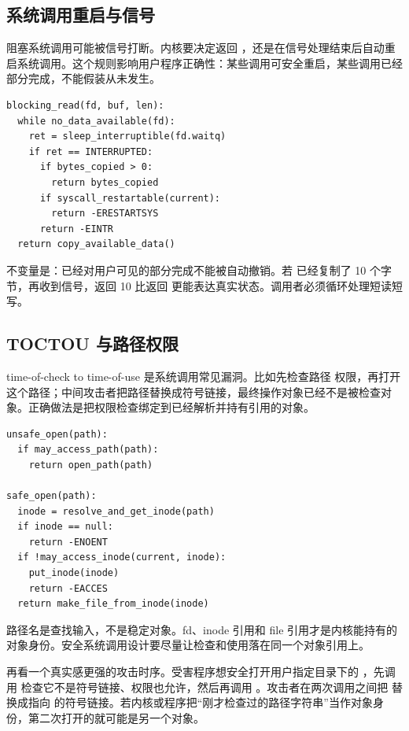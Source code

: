 \subsection{系统调用重启与信号}

阻塞系统调用可能被信号打断。内核要决定返回 ，还是在信号处理结束后自动重启系统调用。这个规则影响用户程序正确性：某些调用可安全重启，某些调用已经部分完成，不能假装从未发生。

\begin{lstlisting}
blocking_read(fd, buf, len):
  while no_data_available(fd):
    ret = sleep_interruptible(fd.waitq)
    if ret == INTERRUPTED:
      if bytes_copied > 0:
        return bytes_copied
      if syscall_restartable(current):
        return -ERESTARTSYS
      return -EINTR
  return copy_available_data()
\end{lstlisting}

不变量是：已经对用户可见的部分完成不能被自动撤销。若  已经复制了 10 个字节，再收到信号，返回 10 比返回  更能表达真实状态。调用者必须循环处理短读短写。

\subsection{TOCTOU 与路径权限}

time-of-check to time-of-use 是系统调用常见漏洞。比如先检查路径  权限，再打开这个路径；中间攻击者把路径替换成符号链接，最终操作对象已经不是被检查对象。正确做法是把权限检查绑定到已经解析并持有引用的对象。

\begin{lstlisting}
unsafe_open(path):
  if may_access_path(path):
    return open_path(path)

safe_open(path):
  inode = resolve_and_get_inode(path)
  if inode == null:
    return -ENOENT
  if !may_access_inode(current, inode):
    put_inode(inode)
    return -EACCES
  return make_file_from_inode(inode)
\end{lstlisting}

路径名是查找输入，不是稳定对象。fd、inode 引用和 file 引用才是内核能持有的对象身份。安全系统调用设计要尽量让检查和使用落在同一个对象引用上。

再看一个真实感更强的攻击时序。受害程序想安全打开用户指定目录下的 ，先调用  检查它不是符号链接、权限也允许，然后再调用 。攻击者在两次调用之间把  替换成指向  的符号链接。若内核或程序把“刚才检查过的路径字符串”当作对象身份，第二次打开的就可能是另一个对象。

